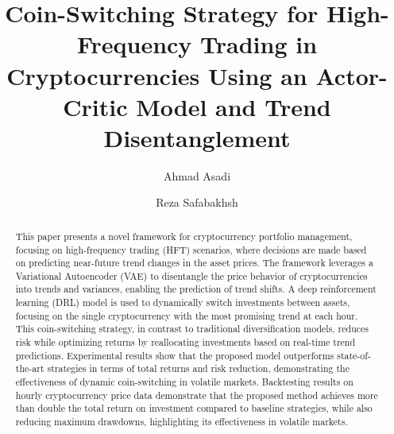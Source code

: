 \documentclass[preprint,review,12pt]{elsarticle}
\begin{document}
\begin{frontmatter}

\title{Coin-Switching Strategy for High-Frequency Trading in Cryptocurrencies Using an Actor-Critic Model and Trend Disentanglement}

\author{Ahmad Asadi}%
\author{Reza Safabakhsh}




\address{Deep Learning Lab, Computer Engineering Department}
\address{Amirkabir University of Technology, Tehran, Iran.}

\begin{abstract}
This paper presents a novel framework for cryptocurrency portfolio management, focusing on high-frequency trading (HFT) scenarios, where decisions are made based on predicting near-future trend changes in the asset prices. The framework leverages a Variational Autoencoder (VAE) to disentangle the price behavior of cryptocurrencies into trends and variances, enabling the prediction of trend shifts. A deep reinforcement learning (DRL) model is used to dynamically switch investments between assets, focusing on the single cryptocurrency with the most promising trend at each hour. This coin-switching strategy, in contrast to traditional diversification models, reduces risk while optimizing returns by reallocating investments based on real-time trend predictions. Experimental results show that the proposed model outperforms state-of-the-art strategies in terms of total returns and risk reduction, demonstrating the effectiveness of dynamic coin-switching in volatile markets. Backtesting results on hourly cryptocurrency price data demonstrate that the proposed method achieves more than double the total return on investment compared to baseline strategies, while also reducing maximum drawdowns, highlighting its effectiveness in volatile markets.
\end{abstract}



\end{frontmatter}
\end{document}
